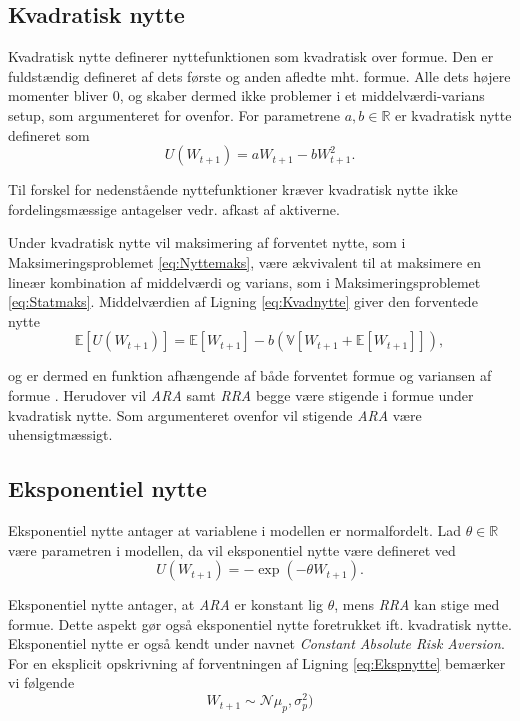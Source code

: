 \documentclass[
  a4paper,
  oneside]{memoir}
\begin{document}
\hypertarget{kvadratisk-nytte}{%
\subsection{Kvadratisk nytte}\label{kvadratisk-nytte}}

Kvadratisk nytte definerer nyttefunktionen som kvadratisk over formue. Den er fuldstændig defineret af dets første og anden afledte mht. formue. Alle dets højere momenter bliver \(0\), og skaber dermed ikke problemer i et middelværdi-varians setup, som argumenteret for ovenfor. For parametrene \(a,b\in\mathbb{R}\) er kvadratisk nytte defineret som
\begin{equation}
U(W_{t+1})=aW_{t+1}-bW_{t+1}^2. \label{eq:Kvadnytte}
\end{equation}

Til forskel for nedenstående nyttefunktioner kræver kvadratisk nytte ikke fordelingsmæssige antagelser vedr. afkast af aktiverne.

Under kvadratisk nytte vil maksimering af forventet nytte, som i Maksimeringsproblemet \eqref{eq:Nyttemaks}, være ækvivalent til at maksimere en lineær kombination af middelværdi og varians, som i Maksimeringsproblemet \eqref{eq:Statmaks}. Middelværdien af Ligning \eqref{eq:Kvadnytte} giver den forventede nytte
\[\mathbb{E}[U(W_{t+1})]=\mathbb{E}[W_{t+1}]-b(\mathbb{V}[W_{t+1}+\mathbb{E}[W_{t+1}]]),\]

og er dermed en funktion afhængende af både forventet formue og variansen af formue \citep{Munk2017}. Herudover vil \emph{ARA} samt \emph{RRA} begge være stigende i formue under kvadratisk nytte. Som argumenteret ovenfor vil stigende \emph{ARA} være uhensigtmæssigt.

\hypertarget{eksponentiel-nytte}{%
\subsection{Eksponentiel nytte}\label{eksponentiel-nytte}}

Eksponentiel nytte antager at variablene i modellen er normalfordelt. Lad \(\theta\in\mathbb{R}\) være parametren i modellen, da vil eksponentiel nytte være defineret ved
\begin{equation}
U(W_{t+1})=-\exp\left(-\theta W_{t+1}\right). \label{eq:Ekspnytte}
\end{equation}

Eksponentiel nytte antager, at \emph{ARA} er konstant lig \(\theta\), mens \emph{RRA} kan stige med formue. Dette aspekt gør også eksponentiel nytte foretrukket ift. kvadratisk nytte. Eksponentiel nytte er også kendt under navnet \emph{Constant Absolute Risk Aversion}. For en eksplicit opskrivning af forventningen af Ligning \eqref{eq:Ekspnytte} bemærker vi følgende
\[W_{t+1}\sim \mathcal{N}\mu_p,\sigma_p^2)\]
\end{document}
